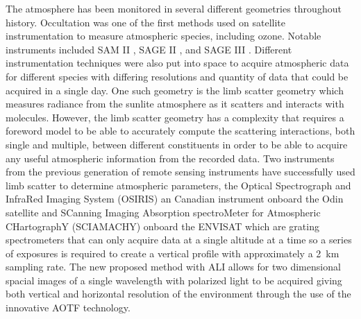 \documentclass[12pt]{article}
\begin{document}
The atmosphere has been monitored in several different geometries throughout history. Occultation was one of the first methods used on satellite instrumentation to measure atmospheric species, including ozone. Notable instruments included SAM II \citep{McCormick1979}, SAGE II \citep{McCormick1987}, and SAGE III \citep{Thomason2003}. Different instrumentation techniques were also put into space to acquire atmospheric data for different species with differing resolutions and quantity of data that could be acquired in a single day. One such geometry is the limb scatter geometry which measures radiance from the sunlite atmosphere as it scatters and interacts with molecules. However, the limb scatter geometry has a complexity that requires a foreword model to be able to accurately compute the scattering interactions, both single and multiple, between different constituents in order to be able to acquire any useful atmospheric information from the recorded data. Two instruments from the previous generation of remote sensing instruments have successfully used limb scatter to determine atmospheric parameters, the Optical Spectrograph and InfraRed Imaging System (OSIRIS) an Canadian instrument onboard the Odin satellite \citep{Llewellyn2004} and SCanning Imaging Absorption spectroMeter for Atmospheric CHartographY (SCIAMACHY) onboard the ENVISAT \citep{Bovensmann1999} which are grating spectrometers that can only acquire data at a single altitude at a time so a series of exposures is required to create a vertical profile with approximately a 2~km sampling rate. The new proposed method with ALI allows for two dimensional spacial images of a single wavelength with polarized light to be acquired giving both vertical and horizontal resolution of the environment through the use of the innovative AOTF technology.
\end{document}
